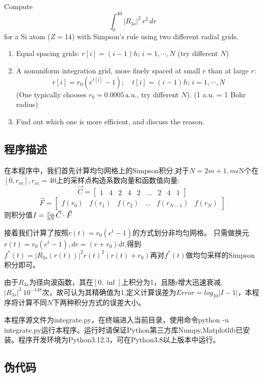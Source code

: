 \documentclass[11pt]{article}
\begin{document}
Compute
\[
\int_0^{40} |R_{3s}|^2 \, r^2 \, dr
\]
for a Si atom (\( Z=14 \)) with Simpson’s rule using two different radial grids.

\begin{enumerate}
  \item Equal spacing grids: \( r[i] = (i - 1)h; \, i = 1, \cdots, N \) (try different \( N \))
  
  \item A nonuniform integration grid, more finely spaced at small \( r \) than at large \( r \): 
  \[
  r[i] = r_0 (e^{t[i]} - 1); \quad t[i] = (i - 1)h; \, i = 1, \cdots, N
  \]
  (One typically chooses \( r_0 = 0.0005 \, \text{a.u.} \), try different \( N \)). (1 a.u. = 1 Bohr radius)
  
  \item Find out which one is more efficient, and discuss the reason.
\end{enumerate}


\subsection{程序描述}
在本程序中，我们首先计算均匀网格上的Simpson积分,对于$N=2m+1,m \epsilon \mathrm{N}$个在$[0,r_m],r_m=40$上的采样点构造系数向量和函数值向量:
\[
\vec{C} = 
\begin{bmatrix}
1 & 4 & 2 & 4 & 2 & \ldots & 2 & 4 & 1
\end{bmatrix}
\]
\[
\vec{F} = 
\begin{bmatrix}
f(r_0) & f(r_1) & f(r_2) & \ldots & f(r_{N-1})  & f(r_{N})
\end{bmatrix}
\]
则积分值$I={r_m \over 3N}\vec{C}\cdot\vec{F}$

    接着我们计算了按照$r(t) = r_0 (e^{t} - 1)$的方式划分非均匀网格。
    只需做换元$r(t)=r_0 (e^t-1),dr=(r+r_0)dt$,得到$f^*(t)=|R_{3s}(r(t))|^2r(t)^2(r(t)+r_0)$再对$f^*(t)$做均匀采样的Simpson积分即可。

    由于$R_{3s}$为径向波函数，其在$[0,\inf]$上积分为1，且随r增大迅速衰减, $|R_{3s}|^2 ~ 10^{-148}$次，故可认为其精确值为1,定义计算误差为$Error=log_{10}|I-1|$，本程序将计算不同$N$下两种积分方式的误差大小。

本程序源文件为integrate.py，在终端进入当前目录，使用命令python -u integrate.py运行本程序。运行时请保证Python第三方库Numpy,Matplotlib已安装。程序开发环境为Python3.12.3，可在Python3.8以上版本中运行。

\subsection{伪代码}
\end{document}
